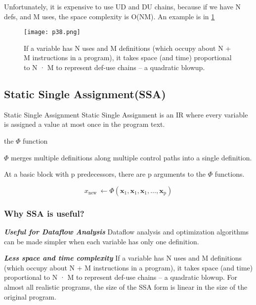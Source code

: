 Unfortunately, it is expensive to use UD and DU chains, because if we have N defs, and M uses, the space complexity is O(NM). An example is in \ref{fig:p38}


\begin{figure}[htb]
    \centering
    \texttt{[image: p38.png]}
    \caption{If a variable has N uses and M definitions (which occupy about N + M instructions in a program), it takes space (and time) proportional to N · M to represent def-use chains – a quadratic blowup.}
    \label{fig:p38}
\end{figure}


\subsection{Static Single Assignment(SSA)}

\begin{definition}{Static Single Assignment }
    Static Single Assignment is an IR where every variable is assigned a value at most once in the program text.
\end{definition}








\begin{definition}{the $\Phi$ function}

     $\Phi$ merges multiple definitions along multiple control paths into a single definition.

     At a basic block with p predecessors, there are p arguments to the $\Phi$ functions.

     $$ x_{\text {new }} \leftarrow \Phi\left(\mathbf{x}_1, \mathbf{x}_1, \mathbf{x}_1, \ldots, \mathbf{x}_{\mathrm{p}}\right)
     $$
\end{definition}

\subsubsection{Why SSA is useful?}

\textbf{ \large \textit{Useful for Dataflow Analysis}} Dataflow analysis and optimization algorithms can be made simpler when each variable has only one definition.

\textbf{ \large \textit{Less space and time complexity}} If a variable has N uses and M definitions (which occupy about N + M instructions in a program), it takes space (and time) proportional to N · M to represent def-use chains – a quadratic blowup. For almost all realistic programs, the size of the SSA form is linear in the size of the original program.


